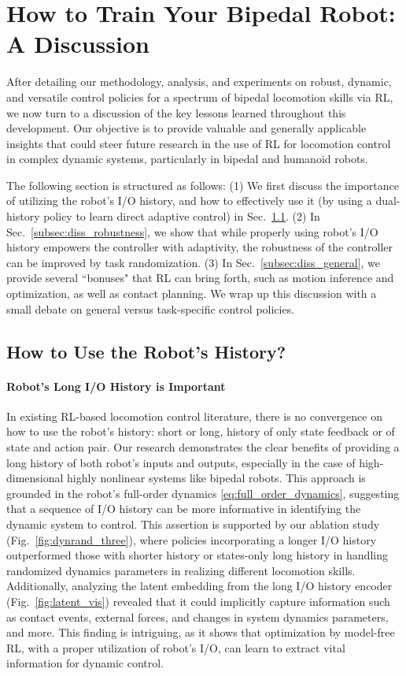\section{How to Train Your Bipedal Robot: A Discussion}\label{sec:discussion}
After detailing our methodology, analysis, and experiments on robust, dynamic, and versatile control policies for a spectrum of bipedal locomotion skills via RL, we now turn to a discussion of the key lessons learned throughout this development. 
Our objective is to provide valuable and generally applicable insights that could steer future research in the use of RL for locomotion control in complex dynamic systems, particularly in bipedal and humanoid robots.

The following section is structured as follows: (1) We first discuss the importance of utilizing the robot's I/O history, and how to effectively use it (by using a dual-history policy to learn direct adaptive control) in Sec.~\ref{subsec:diss_history}. (2) In Sec.~\ref{subsec:diss_robustness}, we show that while properly using robot's I/O history empowers the controller with adaptivity, the robustness of the controller can be improved by task randomization. (3) In Sec.~\ref{subsec:diss_general}, we provide several “bonuses" that RL can bring forth, such as motion inference and optimization, as well as contact planning. We wrap up this discussion with a small debate on general versus task-specific control policies. 

\subsection{How to Use the Robot's History?}\label{subsec:diss_history}
\paragraph{Robot's Long I/O History is Important}
In existing RL-based locomotion control literature, there is no convergence on how to use the robot's history: short or long, history of only state feedback or of state and action pair. 
Our research demonstrates the clear benefits of providing a long history of both robot's inputs and outputs, especially in the case of high-dimensional highly nonlinear systems like bipedal robots.  
This approach is grounded in the robot's full-order dynamics \eqref{eq:full_order_dynamics}, suggesting that a sequence of I/O history can be more informative in identifying the dynamic system to control.
This assertion is supported by our ablation study (Fig.~\ref{fig:dynrand_three}), where policies incorporating a longer I/O history outperformed those with shorter history or states-only long history in handling randomized dynamics parameters in realizing different locomotion skills. 
Additionally, analyzing the latent embedding from the long I/O history encoder (Fig.~\ref{fig:latent_vis}) revealed that it could implicitly capture information such as contact events, external forces, and changes in system dynamics parameters, and more.
This finding is intriguing, as it shows that optimization by model-free RL, with a proper utilization of robot's I/O, can learn to extract vital information for dynamic control. 


